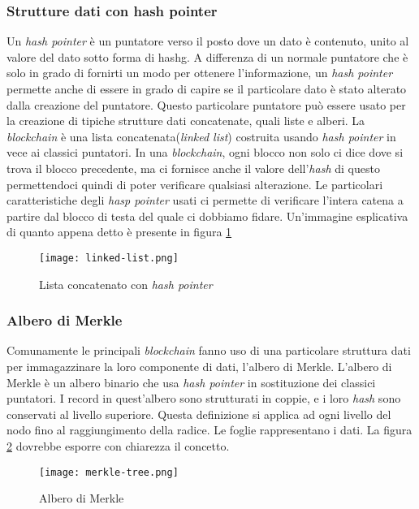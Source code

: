 \subsubsection{Strutture dati con hash pointer}
Un \emph{hash pointer} è un puntatore verso il posto dove un dato è contenuto, unito al valore del dato sotto forma di \gls{hashg}. A differenza di un normale puntatore che è solo in grado di fornirti un modo per ottenere l'informazione, un \emph{hash pointer} permette anche di essere in grado di capire se il particolare dato è stato alterato dalla creazione del puntatore. Questo particolare puntatore può essere usato per la creazione di tipiche strutture dati concatenate, quali liste e alberi. La \emph{blockchain} è una lista concatenata(\emph{linked list}) costruita usando \emph{hash pointer} in vece ai classici puntatori. In una \emph{blockchain}, ogni blocco non solo ci dice dove si trova il blocco precedente, ma ci fornisce anche il valore dell'\textit{hash} di questo permettendoci quindi di poter verificare qualsiasi alterazione. Le particolari caratteristiche degli \emph{hasp pointer} usati ci permette di verificare l'intera catena a partire dal blocco di testa del quale ci dobbiamo fidare. 
Un'immagine esplicativa di quanto appena detto è presente in figura \ref{fig:linked-list}

\begin{figure}[!h]
    \centering
    \texttt{[image: linked-list.png]}
    \caption{Lista concatenato con \emph{hash pointer}}
    \label{fig:linked-list} 
\end{figure}

\subsubsection{Albero di Merkle}
Comunamente le principali \emph{blockchain} fanno uso di una particolare struttura dati per immagazzinare la loro componente di dati, l'albero di Merkle. L'albero di Merkle è un albero binario che usa \emph{hash pointer} in sostituzione dei classici puntatori. I record in quest'albero sono strutturati in coppie, e i loro \emph{hash} sono conservati al livello superiore. Questa definizione si applica ad ogni livello del nodo fino al raggiungimento della radice. Le foglie rappresentano i dati. La figura \ref{fig:merkle-tree} dovrebbe esporre con chiarezza il concetto.

\begin{figure}[!h]
    \centering
    \texttt{[image: merkle-tree.png]}
    \caption{Albero di Merkle}
    \label{fig:merkle-tree} 
\end{figure}

